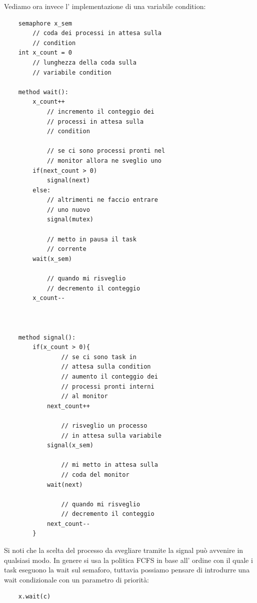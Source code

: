 Vediamo ora invece l' implementazione di una variabile condition:
\begin{verbatim}
    semaphore x_sem
        // coda dei processi in attesa sulla
        // condition
    int x_count = 0
        // lunghezza della coda sulla
        // variabile condition

    method wait():
        x_count++
            // incremento il conteggio dei
            // processi in attesa sulla
            // condition

            // se ci sono processi pronti nel
            // monitor allora ne sveglio uno
        if(next_count > 0)
            signal(next)
        else:
            // altrimenti ne faccio entrare
            // uno nuovo
            signal(mutex)
        
            // metto in pausa il task
            // corrente
        wait(x_sem)

            // quando mi risveglio
            // decremento il conteggio
        x_count--



    method signal():
        if(x_count > 0){
                // se ci sono task in 
                // attesa sulla condition
                // aumento il conteggio dei
                // processi pronti interni
                // al monitor
            next_count++

                // risveglio un processo
                // in attesa sulla variabile
            signal(x_sem)

                // mi metto in attesa sulla
                // coda del monitor
            wait(next)

                // quando mi risveglio
                // decremento il conteggio
            next_count-- 
        }
\end{verbatim}

Si noti che la scelta del processo da svegliare tramite la signal può avvenire in qualsiasi modo.
In genere si usa la politica FCFS in base all' ordine con il quale i task eseguono la wait sul semaforo, tuttavia possiamo pensare di introdurre una wait condizionale con un parametro di priorità:
\begin{verbatim}
    x.wait(c)
\end{verbatim}

